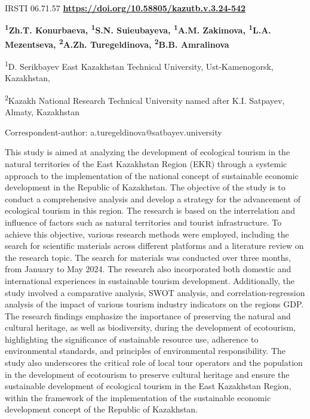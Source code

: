 \newpage
IRSTI 06.71.57
\hfill {\bfseries \href{https://doi.org/10.58805/kazutb.v.3.24-542}{https://doi.org/10.58805/kazutb.v.3.24-542}}


\begin{center}
{\bfseries \textsuperscript{1}Zh.T. Konurbaeva, \textsuperscript{1}S.N.
Suieubayeva, \textsuperscript{1}A.M. Zakimova, \textsuperscript{1}L.A.
Mezentseva, \textsuperscript{2}A.Zh. Turegeldinova\envelope,
\textsuperscript{2}B.B. Amralinova}

\textsuperscript{1}D. Serikbayev East Kazakhstan Technical University,
Ust-Kamenogorsk, Kazakhstan,

\textsuperscript{2}Kazakh National Research Technical University named
after K.I. Satpayev, Almaty, Kazakhstan
\end{center}

\envelope Correspondent-author:
a.turegeldinova@satbayev.university

This study is aimed at analyzing the development of ecological tourism
in the natural territories of the East Kazakhstan Region (EKR) through a
systemic approach to the implementation of the national concept of
sustainable economic development in the Republic of Kazakhstan. The
objective of the study is to conduct a comprehensive analysis and
develop a strategy for the advancement of ecological tourism in this
region. The research is based on the interrelation and influence of
factors such as natural territories and tourist infrastructure. To
achieve this objective, various research methods were employed,
including the search for scientific materials across different platforms
and a literature review on the research topic. The search for materials
was conducted over three months, from January to May 2024. The research
also incorporated both domestic and international experiences in
sustainable tourism development. Additionally, the study involved a
comparative analysis, SWOT analysis, and correlation-regression analysis
of the impact of various tourism industry indicators on the
region\textquotesingle s GDP. The research findings emphasize the
importance of preserving the natural and cultural heritage, as well as
biodiversity, during the development of ecotourism, highlighting the
significance of sustainable resource use, adherence to environmental
standards, and principles of environmental responsibility. The study
also underscores the critical role of local tour operators and the
population in the development of ecotourism to preserve cultural
heritage and ensure the sustainable development of ecological tourism in
the East Kazakhstan Region, within the framework of the implementation
of the sustainable economic development concept of the Republic of
Kazakhstan.

